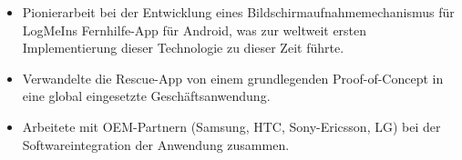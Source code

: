 \begin{itemize}
  \item Pionierarbeit bei der Entwicklung eines Bildschirmaufnahmemechanismus für LogMeIns Fernhilfe-App für Android, was zur weltweit ersten Implementierung dieser Technologie zu dieser Zeit führte.
  \item Verwandelte die Rescue-App von einem grundlegenden Proof-of-Concept in eine global eingesetzte Geschäftsanwendung.
  \item Arbeitete mit OEM-Partnern (Samsung, HTC, Sony-Ericsson, LG) bei der Softwareintegration der Anwendung zusammen.
\end{itemize}
\divider
